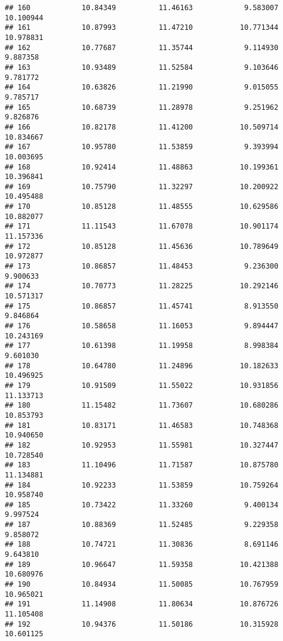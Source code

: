 \documentclass[
]{article}
\begin{document}
\begin{verbatim}
## 160            10.84349          11.46163            9.583007         10.100944
## 161            10.87993          11.47210           10.771344         10.978831
## 162            10.77687          11.35744            9.114930          9.887358
## 163            10.93489          11.52584            9.103646          9.781772
## 164            10.63826          11.21990            9.015055          9.785717
## 165            10.68739          11.28978            9.251962          9.826876
## 166            10.82178          11.41200           10.509714         10.834667
## 167            10.95780          11.53859            9.393994         10.003695
## 168            10.92414          11.48863           10.199361         10.396841
## 169            10.75790          11.32297           10.200922         10.495488
## 170            10.85128          11.48555           10.629586         10.882077
## 171            11.11543          11.67078           10.901174         11.157336
## 172            10.85128          11.45636           10.789649         10.972877
## 173            10.86857          11.48453            9.236300          9.900633
## 174            10.70773          11.28225           10.292146         10.571317
## 175            10.86857          11.45741            8.913550          9.846864
## 176            10.58658          11.16053            9.894447         10.243169
## 177            10.61398          11.19958            8.998384          9.601030
## 178            10.64780          11.24896           10.182633         10.496925
## 179            10.91509          11.55022           10.931856         11.133713
## 180            11.15482          11.73607           10.680286         10.853793
## 181            10.83171          11.46583           10.748368         10.940650
## 182            10.92953          11.55981           10.327447         10.728540
## 183            11.10496          11.71587           10.875780         11.134881
## 184            10.92233          11.53859           10.759264         10.958740
## 185            10.73422          11.33260            9.400134          9.997524
## 187            10.88369          11.52485            9.229358          9.858072
## 188            10.74721          11.30836            8.691146          9.643810
## 189            10.96647          11.59358           10.421388         10.680976
## 190            10.84934          11.50085           10.767959         10.965021
## 191            11.14908          11.80634           10.876726         11.105408
## 192            10.94376          11.50186           10.315928         10.601125

\end{verbatim}
\end{document}
